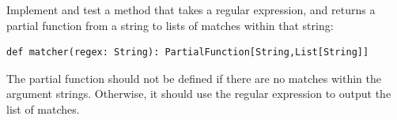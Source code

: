 \documentclass[11pt]{article}
\begin{document}
\begin{myExercise}
Implement and test a method that takes a regular expression, and returns a partial function from a string to lists of matches within that string:
\begin{lstlisting}
def matcher(regex: String): PartialFunction[String,List[String]]
\end{lstlisting}
The partial function should not be defined if there are no matches within the argument strings. Otherwise, it should use the regular expression to output the list of matches.
\end{myExercise}








\end{document}
